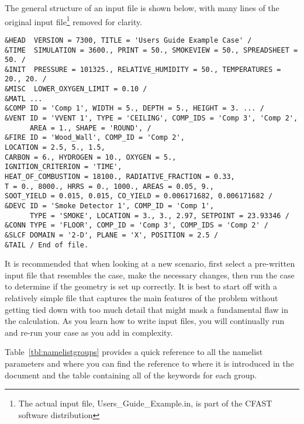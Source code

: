 The general structure of an input file is shown below, with many lines of the original input file\footnote{The actual input file, Users\_Guide\_Example.in, is part of the CFAST software distribution} removed for clarity.

\begin{lstlisting}
&HEAD  VERSION = 7300, TITLE = 'Users Guide Example Case' /
&TIME  SIMULATION = 3600., PRINT = 50., SMOKEVIEW = 50., SPREADSHEET = 50. /
&INIT  PRESSURE = 101325., RELATIVE_HUMIDITY = 50., TEMPERATURES = 20., 20. /
&MISC  LOWER_OXYGEN_LIMIT = 0.10 /
&MATL ...
&COMP ID = 'Comp 1', WIDTH = 5., DEPTH = 5., HEIGHT = 3. ... /
&VENT ID = 'VVENT 1', TYPE = 'CEILING', COMP_IDS = 'Comp 3', 'Comp 2',
      AREA = 1., SHAPE = 'ROUND', /
&FIRE ID = 'Wood_Wall', COMP_ID = 'Comp 2',
LOCATION = 2.5, 5., 1.5,
CARBON = 6., HYDROGEN = 10., OXYGEN = 5.,
IGNITION_CRITERION = 'TIME',
HEAT_OF_COMBUSTION = 18100., RADIATIVE_FRACTION = 0.33,
T = 0., 8000., HRRS = 0., 1000., AREAS = 0.05, 9.,
SOOT_YIELD = 0.015, 0.015, CO_YIELD = 0.006171682, 0.006171682 /
&DEVC ID = 'Smoke Detector 1', COMP_ID = 'Comp 1',
      TYPE = 'SMOKE', LOCATION = 3., 3., 2.97, SETPOINT = 23.93346 /
&CONN TYPE = 'FLOOR', COMP_ID = 'Comp 3', COMP_IDS = 'Comp 2' /
&SLCF DOMAIN = '2-D', PLANE = 'X', POSITION = 2.5 /
&TAIL / End of file.
\end{lstlisting}
It is recommended that when looking at a new scenario, first select a pre-written input file that resembles the case, make the necessary changes, then run the case to determine if the geometry is set up correctly. It is best to start off with a relatively simple file that captures the main features of the problem without getting tied down with too much detail that might mask a fundamental flaw in the calculation. As you learn how to write input files, you will continually run and re-run your case as you add in complexity.

Table~\ref{tbl:namelistgroups} provides a quick reference to all the namelist parameters and where you can find the reference to where it is introduced in the document and the table containing all of the keywords for each group.


